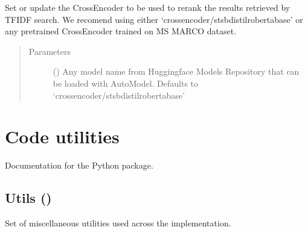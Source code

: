 \documentclass[letterpaper,10pt,english]{sphinxmanual}
\begin{document}
\begin{fulllineitems}
\begin{fulllineitems}
\label{\detokenize{code:lexical_search.TfIdfSearch.setup_crossencoder}}
Set or update the Cross\sphinxhyphen{}Encoder to be used to re\sphinxhyphen{}rank the results 
retrieved by TF\sphinxhyphen{}IDF search. We recomend using either 
‘cross\sphinxhyphen{}encoder/stsb\sphinxhyphen{}distilroberta\sphinxhyphen{}base’ or any pretrained Cross\sphinxhyphen{}Encoder
trained on  MS MARCO dataset.
\begin{quote}\begin{description}
\item[{Parameters}] \leavevmode
{} (\sphinxstyleliteralemphasis{\sphinxupquote{, }}) \textendash{} Any model name from Huggingface Models 
Repository that can be loaded with AutoModel. Defaults to 
‘cross\sphinxhyphen{}encoder/stsb\sphinxhyphen{}distilroberta\sphinxhyphen{}base’

\end{description}\end{quote}

\end{fulllineitems}


\end{fulllineitems}



\chapter{Code utilities}
\label{\detokenize{code:code-utilities}}
Documentation for the  Python package.


\section{Utils ()}
\label{\detokenize{code:module-code_utils.utils}}\label{\detokenize{code:utils-utils-py}}
Set of miscellaneous utilities used across the implementation.
\end{document}
